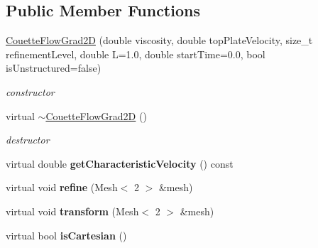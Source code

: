 \subsection*{Public Member Functions}
\begin{DoxyCompactItemize}
\item 
\hyperlink{classnatrium_1_1CouetteFlowGrad2D_a06404aab631016fcf3850339402550e3}{CouetteFlowGrad2D} (double viscosity, double topPlateVelocity, size\_\-t refinementLevel, double L=1.0, double startTime=0.0, bool isUnstructured=false)
\begin{DoxyCompactList}\small\item\em constructor \item\end{DoxyCompactList}\item 
\hypertarget{classnatrium_1_1CouetteFlowGrad2D_ab216121a846c30d31a18c5969112a182}{
virtual \hyperlink{classnatrium_1_1CouetteFlowGrad2D_ab216121a846c30d31a18c5969112a182}{$\sim$CouetteFlowGrad2D} ()}
\label{classnatrium_1_1CouetteFlowGrad2D_ab216121a846c30d31a18c5969112a182}

\begin{DoxyCompactList}\small\item\em destructor \item\end{DoxyCompactList}\item 
\hypertarget{classnatrium_1_1CouetteFlowGrad2D_a05395f1ddd439fcbbf99e5d6b41a1c6a}{
virtual double {\bfseries getCharacteristicVelocity} () const }
\label{classnatrium_1_1CouetteFlowGrad2D_a05395f1ddd439fcbbf99e5d6b41a1c6a}

\item 
\hypertarget{classnatrium_1_1CouetteFlowGrad2D_ac58feae313a7c9edfbfd16adcb6d1585}{
virtual void {\bfseries refine} (Mesh$<$ 2 $>$ \&mesh)}
\label{classnatrium_1_1CouetteFlowGrad2D_ac58feae313a7c9edfbfd16adcb6d1585}

\item 
\hypertarget{classnatrium_1_1CouetteFlowGrad2D_a08a61536fbdcff1fdc91b9ed62f96a3d}{
virtual void {\bfseries transform} (Mesh$<$ 2 $>$ \&mesh)}
\label{classnatrium_1_1CouetteFlowGrad2D_a08a61536fbdcff1fdc91b9ed62f96a3d}

\item 
\hypertarget{classnatrium_1_1CouetteFlowGrad2D_af3a585d50ee8ce107e9ec8f57edbcc8b}{
virtual bool {\bfseries isCartesian} ()}
\label{classnatrium_1_1CouetteFlowGrad2D_af3a585d50ee8ce107e9ec8f57edbcc8b}

\end{DoxyCompactItemize}


